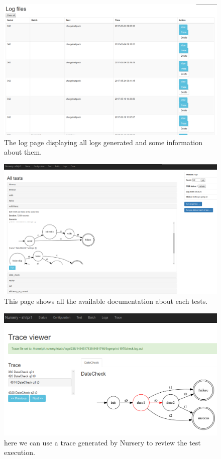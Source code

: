 \documentclass[12pt]{article}
\theoremstyle{definition}
\theoremstyle{definition}
\theoremstyle{remark}
\begin{document}
\begin{figure}
    \centering
    \includegraphics[scale=0.4]{wa_logs.png}
    \caption{The log page displaying all logs generated and some information about them.}
    \label{wa_logs}
\end{figure}

\begin{figure}
    \centering
    \includegraphics[scale=0.2]{wa_tests_doc.png}
    \caption{This page shows all the available documentation about each tests.}
    \label{wa_tests_doc}
\end{figure}

\begin{figure}
    \centering
    \includegraphics[scale=0.4]{wa_trace.png}
    \caption{here we can use a trace generated by Nursery to review the test execution.}
    \label{wa_trace}
\end{figure}
\end{document}
